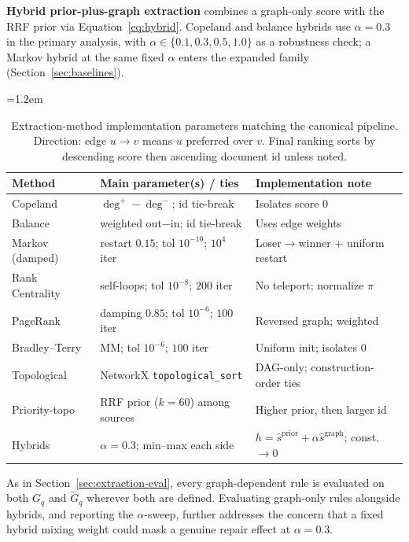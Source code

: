 \documentclass[pdflatex,sn-basic,Numbered]{sn-jnl}
\newcommand{\sncstable}{%
  \footnotesize
  \renewcommand{\arraystretch}{1.28}%
  \setlength{\tabcolsep}{3.8pt}%
  \tolerance=2000%
  \emergencystretch=1.2em%
  \hyphenpenalty=200\exhyphenpenalty=200\relax
}
\begin{document}
\textbf{Hybrid prior-plus-graph extraction} combines a graph-only score
with the RRF prior via Equation~\eqref{eq:hybrid}. Copeland and balance
hybrids use $\alpha=0.3$ in the primary analysis, with
$\alpha \in \{0.1,0.3,0.5,1.0\}$ as a robustness check; a Markov hybrid at
the same fixed $\alpha$ enters the expanded family
(Section~\ref{sec:baselines}).

\begin{table}[t]
  \caption{Extraction-method implementation parameters matching the
    canonical pipeline. Direction: edge $u\to v$ means $u$ preferred over
    $v$. Final ranking sorts by descending score then ascending document id
    unless noted.}
  \label{tab:extraction-params}
  \sncstable
  \begin{tabularx}{\linewidth}{@{}lYY@{}}
    \toprule
    Method & Main parameter(s) / ties & Implementation note \\
    \midrule
    Copeland & $\deg^+-\deg^-$; id tie-break & Isolates score $0$ \\
    \addlinespace
    Balance & weighted out$-$in; id tie-break & Uses edge weights \\
    \addlinespace
    Markov (damped) & restart $0.15$; tol $10^{-10}$; $10^{4}$ iter & Loser$\to$winner + uniform restart \\
    \addlinespace
    Rank Centrality & self-loops; tol $10^{-8}$; $200$ iter & No teleport; normalize $\pi$ \\
    \addlinespace
    PageRank & damping $0.85$; tol $10^{-6}$; $100$ iter & Reversed graph; weighted \\
    \addlinespace
    Bradley--Terry & MM; tol $10^{-6}$; $100$ iter & Uniform init; isolates $0$ \\
    \addlinespace
    Topological & NetworkX \texttt{topological\_sort} & DAG-only; construction-order ties \\
    \addlinespace
    Priority-topo & RRF prior ($k{=}60$) among sources & Higher prior, then larger id \\
    \addlinespace
    Hybrids & $\alpha{=}0.3$; min--max each side & $h=\hat s^{\mathrm{prior}}+\alpha\hat s^{\mathrm{graph}}$; const.\ $\to 0$ \\
    \bottomrule
  \end{tabularx}
\end{table}

As in Section~\ref{sec:extraction-eval}, every graph-dependent rule is
evaluated on both $G_q$ and $\widetilde{G}_q$ wherever both are defined.
Evaluating graph-only rules alongside hybrids, and reporting the
$\alpha$-sweep, further addresses the concern that a fixed hybrid mixing
weight could mask a genuine repair effect at $\alpha=0.3$.
\end{document}
